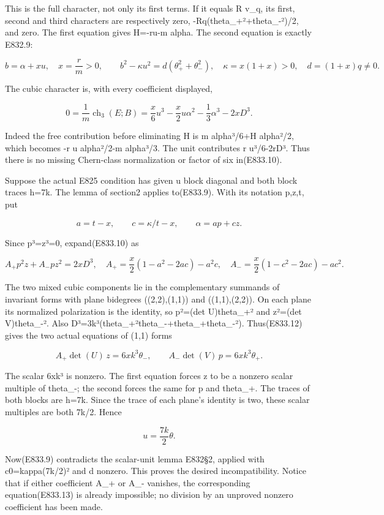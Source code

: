 This is the full character, not only its first terms. If it equals R
v\_q, its first, second and third characters are respectively zero,
-Rq(theta\_+²+theta\_-²)/2, and zero. The first equation gives H=-ru-m
alpha. The second equation is exactly E832.9:

\[
 b=\alpha+xu,\quad x=\frac rm>0,\qquad
 b^2-\kappa u^2=d(\theta_+^2+\theta_-^2),
 \quad\kappa=x(1+x)>0,\quad d=(1+x)q\ne0.
 \tag{E833.9}
\]

The cubic character is, with every coefficient displayed,

\[
 0=\frac1m\operatorname{ch}_3(E;B)
   =\frac x6u^3-\frac x2u\alpha^2-\frac13\alpha^3-2xD^3.
 \tag{E833.10}
\]

Indeed the free contribution before eliminating H is m alpha³/6+H
alpha²/2, which becomes -r u alpha²/2-m alpha³/3. The unit contributes r
u³/6-2rD³. Thus there is no missing Chern-class normalization or factor
of six in(E833.10).

Suppose the actual E825 condition has given u block diagonal and both
block traces h=7k. The lemma of section2 applies to(E833.9). With its
notation p,z,t, put

\[
 a=t-x,\qquad c=\kappa/t-x,
 \qquad \alpha=a p+c z.
 \tag{E833.11}
\]

Since p³=z³=0, expand(E833.10) as

\[
 A_+p^2z+A_-pz^2=2xD^3,
 \quad
 A_+=\frac x2(1-a^2-2ac)-a^2c,
 \quad
 A_-=\frac x2(1-c^2-2ac)-ac^2.
 \tag{E833.12}
\]

The two mixed cubic components lie in the complementary summands of
invariant forms with plane bidegrees ((2,2),(1,1)) and ((1,1),(2,2)). On
each plane its normalized polarization is the identity, so p²=(det
U)theta\_+² and z²=(det V)theta\_-². Also
D³=3k³(theta\_+²theta\_-+theta\_+theta\_-²). Thus(E833.12) gives the two
actual equations of (1,1) forms

\[
 A_+\det(U)\,z=6xk^3\theta_-,\qquad
 A_-\det(V)\,p=6xk^3\theta_+.
 \tag{E833.13}
\]

The scalar 6xk³ is nonzero. The first equation forces z to be a nonzero
scalar multiple of theta\_-; the second forces the same for p and
theta\_+. The traces of both blocks are h=7k. Since the trace of each
plane's identity is two, these scalar multiples are both 7k/2. Hence

\[
 u=\frac{7k}{2}\theta.
 \tag{E833.14}
\]

Now(E833.9) contradicts the scalar-unit lemma E832§2, applied with
c0=kappa(7k/2)² and d nonzero. This proves the desired incompatibility.
Notice that if either coefficient A\_+ or A\_- vanishes, the
corresponding equation(E833.13) is already impossible; no division by an
unproved nonzero coefficient has been made.

